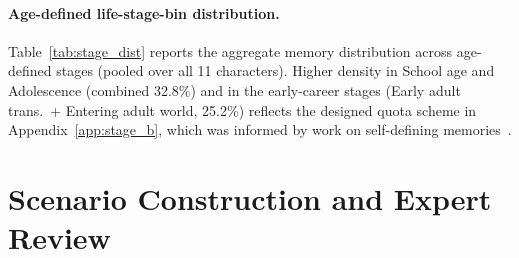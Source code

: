 \documentclass[11pt]{article}
\begin{document}


\paragraph{Age-defined life-stage-bin distribution.}
Table~\ref{tab:stage_dist} reports the aggregate memory distribution across age-defined stages (pooled over all 11 characters). Higher density in School age and Adolescence (combined 32.8\%) and in the early-career stages (Early adult trans.\ + Entering adult world, 25.2\%) reflects the designed quota scheme in Appendix~\ref{app:stage_b}, which was informed by work on self-defining memories~\cite{singer1995seeing}.



\label{app:trait_value_dist}


\FloatBarrier
\section{Scenario Construction and Expert Review}
\label{app:scenario}
\end{document}
